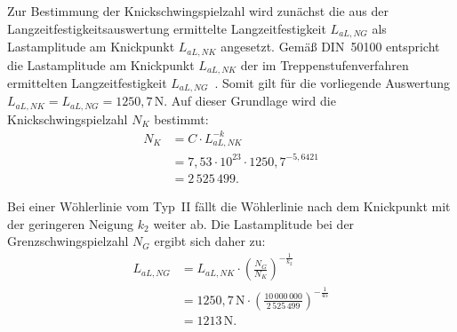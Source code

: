 Zur Bestimmung der Knickschwingspielzahl wird zunächst die aus der 
Langzeitfestigkeitsauswertung ermittelte Langzeitfestigkeit 
$L_{aL,NG}$ als Lastamplitude am Knickpunkt $L_{aL,NK}$ angesetzt. 
Gemäß DIN~50100 entspricht die Lastamplitude am Knickpunkt 
$L_{aL,NK}$ der im Treppenstufenverfahren ermittelten 
Langzeitfestigkeit $L_{aL,NG}$~\cite[Seite~62]{DIN50100}. 
Somit gilt für die vorliegende Auswertung
$L_{aL,NK}=L_{aL,NG}=1250{,}7\,\mathrm{N}$.
Auf dieser Grundlage wird die Knickschwingspielzahl $N_K$ bestimmt:
\begin{align*}
N_K
&= C \cdot L_{aL,NK}^{-k} \\
&= 7{,}53 \cdot 10^{23}
   \cdot 1250{,}7^{-5{,}6421} \\
&= 2\,525\,499.
\end{align*}

Bei einer Wöhlerlinie vom Typ~II fällt die Wöhlerlinie nach dem
Knickpunkt mit der geringeren Neigung $k_2$ weiter ab. Die
Lastamplitude bei der Grenzschwingspielzahl $N_G$ ergibt sich daher zu:
\begin{align*}
L_{aL,NG}
&=
L_{aL,NK}
\cdot
\left(
\frac{N_G}{N_K}
\right)^{-\frac{1}{k_2}} \\[1ex]
&=
1250{,}7\,\mathrm{N}
\cdot
\left(
\frac{10\,000\,000}
     {2\,525\,499}
\right)^{-\frac{1}{45}} \\[1ex]
&= 1213\,\mathrm{N}.
\end{align*}

